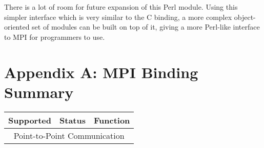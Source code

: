 \documentclass{report}
\begin{document}
	There is a lot of room for future expansion of this Perl module.
Using this simpler interface which is very similar to the C binding, a
more complex object-oriented set of modules can be built on top of it, 
giving a more Perl-like interface to MPI for programmers to use.

\chapter*{Appendix A: MPI Binding Summary}

\begin{tabular}{|l|l|l|}
\hline
\bf{Supported} & \bf{Status}       & \bf{Function} \\ \hline

\hline
\multicolumn{3}{|c|}{ Point-to-Point Communication } \\ \hline


\end{tabular}
\end{document}
